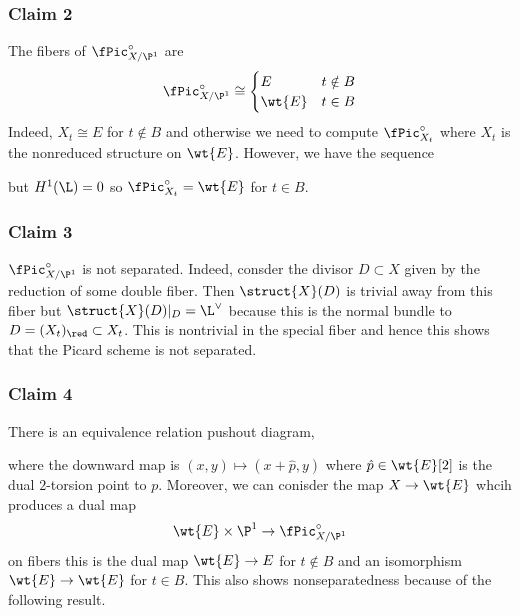 \documentclass[12pt]{article}
\begin{document}
\subsubsection{Claim 2}

The fibers of $\fPic_{X/\P^1}^\circ$ are
\[ \fPic_{X/\P^1}^\circ \cong
\begin{cases}
E & t \notin B
\\
\wt{E} & t \in B
\end{cases} \]
Indeed, $X_t \cong E$ for $t \notin B$ and otherwise we need to compute $\fPic^\circ_{X_t}$ where $X_t$ is the nonreduced structure on $\wt{E}$. However, we have the sequence
\begin{center}
\end{center}
but $H^1(\L) = 0$ so $\fPic_{X_t}^\circ = \wt{E}$ for $t \in B$.

\subsubsection{Claim 3}

$\fPic^\circ_{X/\P^1}$ is not separated. Indeed, consder the divisor $D \subset X$ given by the reduction of some double fiber. Then $\struct{X}(D)$ is trivial away from this fiber but $\struct{X}(D)|_D = \L^\vee$ because this is the normal bundle to $D = (X_t)_{\red} \subset X_t$. This is nontrivial in the special fiber and hence this shows that the Picard scheme is not separated. 

\subsubsection{Claim 4}

There is an \etale equivalence relation pushout diagram,
\begin{center}
\end{center}
where the downward map is $(x,y) \mapsto (x + \hat{p}, y)$ where $\hat{p} \in \wt{E}[2]$ is the dual $2$-torsion point to $p$. Moreover, we can conisder the map $X \to \wt{E}$ whcih produces a dual map
\[ \wt{E} \times \P^1 \to \fPic^\circ_{X/\P^1} \]
on fibers this is the dual map $\wt{E} \to E$ for $t \notin B$ and an isomorphism $\wt{E} \to \wt{E}$ for $t \in B$. This also shows nonseparatedness because of the following result.
\end{document}
